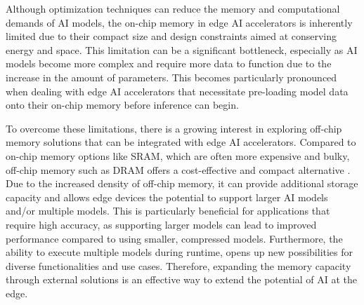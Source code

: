 Although optimization techniques can reduce the memory and computational demands of AI models, the on-chip memory in edge AI accelerators is inherently limited due to their compact size and design constraints aimed at conserving energy and space.
This limitation can be a significant bottleneck, especially as AI models become more complex and require more data to function due to the increase in the amount of parameters.
This becomes particularly pronounced when dealing with edge AI accelerators that necessitate pre-loading model data onto their on-chip memory before inference can begin.

To overcome these limitations, there is a growing interest in exploring off-chip memory solutions that can be integrated with edge AI accelerators.
Compared to on-chip memory options like SRAM, which are often more expensive and bulky, off-chip memory such as DRAM offers a cost-effective and compact alternative \cite{hennessyComputerArchitectureSixth2017}.
Due to the increased density of off-chip memory, it can provide additional storage capacity and allows edge devices the potential to support larger AI models and/or multiple models.
This is particularly beneficial for applications that require high accuracy, as supporting larger models can lead to improved performance compared to using smaller, compressed models.
Furthermore, the ability to execute multiple models during runtime, opens up new possibilities for diverse functionalities and use cases.
Therefore, expanding the memory capacity through external solutions is an effective way to extend the potential of AI at the edge.
